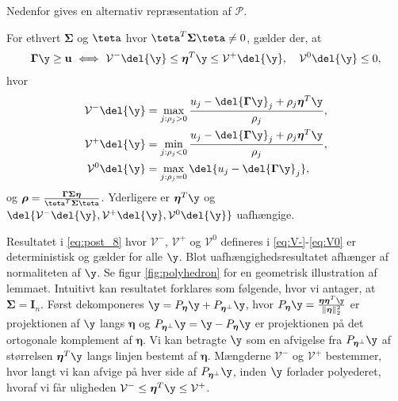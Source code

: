 Nedenfor gives en alternativ repræsentation af \(\mathcal{P}\).
%
\begin{lem} \label{lem:polyhedral}
For ethvert \(\boldsymbol{\Sigma}\) og \(\teta\) hvor \(\teta^T \boldsymbol{\Sigma} \teta \neq 0\), gælder der, at
\begin{align}
\boldsymbol{\Gamma} \y \geq \mathbf{u} \ \Longleftrightarrow \ \mathcal{V}^- \del{\y} \leq \boldsymbol{\eta}^T \y \leq \mathcal{V}^+ \del{\y}, \quad  \mathcal{V}^0 \del{\y} \leq 0, \label{eq:post_8}
\end{align}
hvor
\begin{align}
\mathcal{V}^- \del{\y} &= \max_{j: \rho_j > 0} \frac{u_j - \del{\boldsymbol{\Gamma} \y}_j + \rho_j \boldsymbol{\eta}^T \y}{\rho_j}, \label{eq:V-} \\
\mathcal{V}^+ \del{\y} &= \min_{j: \rho_j < 0} \frac{u_j - \del{\boldsymbol{\Gamma} \y}_j + \rho_j \boldsymbol{\eta}^T \y}{\rho_j}, \label{eq:V+} \\
\mathcal{V}^0 \del{\y} &= \max_{j: \rho_j = 0} \del{u_j - \del{\boldsymbol{\Gamma} \y}_j}, \label{eq:V0} 
\end{align}
og \(\boldsymbol{\rho}=\frac{\boldsymbol{\Gamma} \boldsymbol{\Sigma} \boldsymbol{\eta}}{\teta^T \boldsymbol{\Sigma} \teta}\).
Yderligere  er \(\boldsymbol{\eta}^T \y\) og \(\del{\mathcal{V}^-\del{\y}, \mathcal{V}^+\del{\y},\mathcal{V}^0\del{\y}}\) uafhængige. 
\end{lem}
%
Resultatet i \eqref{eq:post_8} hvor \(\mathcal{V}^-\), \(\mathcal{V}^+\) og \(\mathcal{V}^0\) defineres i \eqref{eq:V-}-\eqref{eq:V0} er deterministisk og gælder for alle \(\y\).
Blot uafhængighedsresultatet afhænger af normaliteten af \(\y\).
Se figur \ref{fig:polyhedron} for en geometrisk illustration af lemmaet.
Intuitivt kan resultatet forklares som følgende, hvor vi antager, at \(\boldsymbol{\Sigma}= \mathbf{I}_n\).
Først dekomponeres \(\y=P_{\boldsymbol{\eta}} \y + P_{\boldsymbol{\eta}^\perp} \y\), hvor \(P_{\boldsymbol{\eta}} \y = \frac{\boldsymbol{\eta} \boldsymbol{\eta}^T \y}{\Vert \boldsymbol{\eta} \Vert_2^2}\) er projektionen af \(\y\) langs \(\boldsymbol{\eta}\) og \(P_{\boldsymbol{\eta}^\perp} \y = \y - P_{\boldsymbol{\eta}} \y\) er projektionen på det ortogonale komplement af \(\boldsymbol{\eta}\).
Vi kan betragte \(\y\) som en afvigelse fra \(P_{\boldsymbol{\eta}^\perp} \y\) af størrelsen \(\boldsymbol{\eta}^T \y\) langs linjen bestemt af \(\boldsymbol{\eta}\).
Mængderne \(\mathcal{V}^-\) og \(\mathcal{V}^+\) bestemmer, hvor langt vi kan afvige på hver side af \(P_{\boldsymbol{\eta}^\perp} \y\), inden \(\y\) forlader polyederet, hvoraf vi får uligheden \(\mathcal{V}^- \leq \boldsymbol{\eta}^T \y \leq \mathcal{V}^+\).
